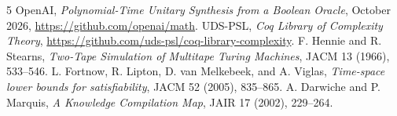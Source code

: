 \documentclass[11pt]{article}
\begin{document}
\begin{thebibliography}{5}
 OpenAI, \emph{Polynomial-Time Unitary Synthesis from a Boolean Oracle}, October 2026, \url{https://github.com/openai/math}.
 UDS-PSL, \emph{Coq Library of Complexity Theory}, \url{https://github.com/uds-psl/coq-library-complexity}.
 F. Hennie and R. Stearns, \emph{Two-Tape Simulation of Multitape Turing Machines}, JACM 13 (1966), 533--546.
 L. Fortnow, R. Lipton, D. van Melkebeek, and A. Viglas, \emph{Time-space lower bounds for satisfiability}, JACM 52 (2005), 835--865.
 A. Darwiche and P. Marquis, \emph{A Knowledge Compilation Map}, JAIR 17 (2002), 229--264.
\end{thebibliography}
\end{document}

